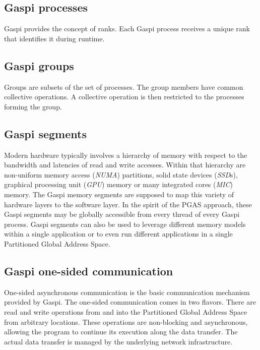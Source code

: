 \documentclass[a4paper]{article}
\newlength{\st}\setlength{\st}{0pt}
\newcommand{\GASPI}{{\sc Gaspi}}
\begin{document}
\subsection{\GASPI{} processes}


\GASPI{} provides the concept of ranks. Each \GASPI{} process receives
a unique rank that identifies it during runtime.

\subsection{\GASPI{} groups}

Groups are subsets of the set of processes. The group members
have common collective operations. A collective operation is then
restricted to the processes forming the group.

\subsection{\GASPI{} segments}

Modern hardware typically involves a hierarchy of memory with respect to the
bandwidth and latencies of read and write accesses. Within that hierarchy are
non-uniform memory access (\emph{NUMA}) partitions, solid state
devices (\emph{SSD}s), graphical processing unit (\emph{GPU}) memory
or many integrated cores (\emph{MIC}) memory.  The \GASPI{} memory
segments are supposed to map this variety of hardware layers to the software
layer. In the spirit of the PGAS approach, these \GASPI{} segments
may be globally accessible from every thread of every \GASPI{} process.
\GASPI{} segments can also be used to leverage different memory models within
a single application or to even run different applications in a single Partitioned Global
Address Space.

\subsection{\GASPI{} one-sided communication}

One-sided asynchronous communication is the basic communication
mechanism provided by \GASPI{}. The one-sided communication comes
in two flavors.  There are read and write operations from and into the
Partitioned Global Address Space from arbitrary locations. These
operations are non-blocking and asynchronous, allowing the program to continue
its execution along the data transfer. The actual data transfer is managed
by the underlying network infrastructure.
\end{document}
